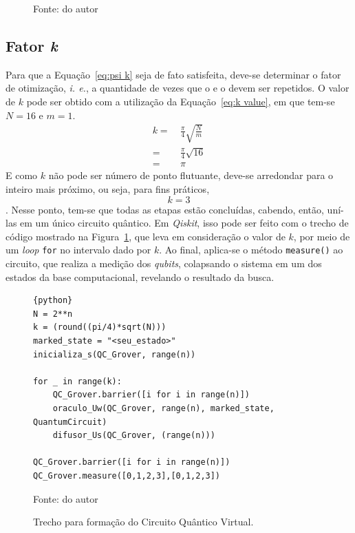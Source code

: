 \begin{figure}[ht!]
    \vspace{0.3em}
    {\small Fonte: do autor} 
\end{figure}

\subsection{Fator \emph{k}}

Para que a Equação~\ref{eq:psi k} seja de fato satisfeita, deve-se determinar o fator de otimização, \emph{i. e.}, a quantidade de vezes que o  e o  devem ser repetidos. O valor de $k$ pode ser obtido com a utilização da Equação~\ref{eq:k value}, em que tem-se $N=16$ e $m=1$.
%
\begin{align*}
    k =&~ \frac{\pi}{4}\sqrt{\frac{N}{m}}\\
    =&~ \frac{\pi}{4}\sqrt{16}\\
    =&~ \pi
\end{align*}
E como $k$ não pode ser número de ponto flutuante, deve-se arredondar para o inteiro mais próximo, ou seja, para fins práticos,
\begin{equation}
    k = 3
    \label{eq:k = 3}
\end{equation}.
Nesse ponto, tem-se que todas as etapas estão concluídas, cabendo, então, uní-las em um único circuito qu\^{a}ntico. Em \emph{Qiskit}, isso pode ser feito com o trecho de código mostrado na Figura~\ref{cod:geraCircuitoCompleto}, que leva em consideração o valor de $k$, por meio de um \textit{loop} \verb|for| no intervalo dado por $k$. Ao final, aplica-se o método \verb|measure()| ao circuito, que realiza a medição dos \textit{qubits}, colapsando o sistema em um dos estados da base computacional, revelando o resultado da busca.

\begin{figure}[!htb]
\centering
\caption{Trecho para formação do Circuito Quântico Virtual.} 
\begin{lstlisting}{python}
N = 2**n
k = (round((pi/4)*sqrt(N)))
marked_state = "<seu_estado>"
inicializa_s(QC_Grover, range(n))

for _ in range(k):
    QC_Grover.barrier([i for i in range(n)])
    oraculo_Uw(QC_Grover, range(n), marked_state, QuantumCircuit)
    difusor_Us(QC_Grover, (range(n)))

QC_Grover.barrier([i for i in range(n)])
QC_Grover.measure([0,1,2,3],[0,1,2,3])
\end{lstlisting} 
{\small Fonte: do autor} 
\label{cod:geraCircuitoCompleto} 
\end{figure}

